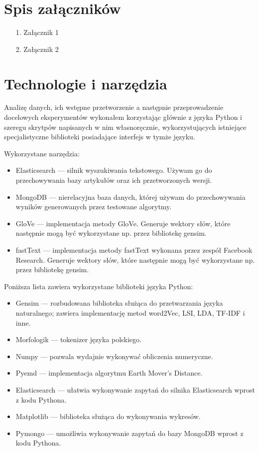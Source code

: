 \documentclass[pl]{minipw} %
\begin{document}
\chapter*{Spis załączników}
\begin{enumerate}
\item[1.] Załącznik 1
\item[2.] Załącznik 2
\end{enumerate}

\newpage
\pagestyle{empty}
\appendix
\chapter{Technologie i narzędzia}
Analizę danych, ich wstępne przetworzenie a następnie przeprowadzenie docelowych eksperymentów wykonałem korzystając głównie z języka Python i szeregu skrytpów napisanych w nim własnoręcznie, wykorzystujących istniejące specjalistyczne biblioteki posiadające interfejs w tymże języku.

Wykorzystane narzędzia:
\begin{itemize}
	\item Elasticsearch --- silnik wyszukiwania tekstowego. Używam go do przechowywania bazy artykułów oraz ich przetworzonych wersji.
	\item MongoDB --- nierelacyjna baza danych, której używam do przechowywania wyników generowanych przez testowane algorytmy.
	\item GloVe --- implementacja metody GloVe. Generuje wektory słów, które następnie mogą być wykorzystane np. przez bibliotekę gensim.
	\item fastText --- implementacja metody fastText wykonana przez zespół Facebook Research. Generuje wektory słów, które następnie mogą być wykorzystane np. przez bibliotekę gensim.
\end{itemize}

Poniższa lista zawiera wykorzystane biblioteki języka Python:
\begin{itemize}
	\item Gensim --- rozbudowana biblioteka służąca do przetwarzania języka naturalnego; zawiera implementację metod word2Vec, LSI, LDA, TF-IDF i inne.
	\item Morfologik --- tokenizer języka polskiego.
	\item Numpy --- pozwala wydajnie wykonywać obliczenia numeryczne.
	\item Pyemd --- implementacja algorytmu Earth Mover's Distance.
	\item Elasticsearch --- ułatwia wykonywanie zapytań do silnika Elasticsearch wprost z kodu Pythona.
	\item Matplotlib --- biblioteka służąca do wykonywania wykresów.
	\item Pymongo --- umożliwia wykonywanie zapytań do bazy MongoDB wprost z kodu Pythona.
\end{itemize}
\end{document}
